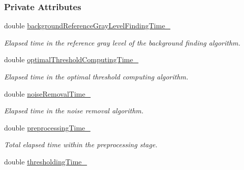 \subsubsection*{Private Attributes}
\begin{CompactItemize}
\item 
\hypertarget{class_statistics_ac1d32288eac323391e66b2ff1a878e8}{
double \hyperlink{class_statistics_ac1d32288eac323391e66b2ff1a878e8}{backgroundReferenceGrayLevelFindingTime\_\-}}
\label{class_statistics_ac1d32288eac323391e66b2ff1a878e8}

\begin{CompactList}\small\item\em Elapsed time in the reference gray level of the background finding algorithm. \item\end{CompactList}\item 
\hypertarget{class_statistics_b8cb0f26533cee29b94f3a556b00e943}{
double \hyperlink{class_statistics_b8cb0f26533cee29b94f3a556b00e943}{optimalThresholdComputingTime\_\-}}
\label{class_statistics_b8cb0f26533cee29b94f3a556b00e943}

\begin{CompactList}\small\item\em Elapsed time in the optimal threshold computing algorithm. \item\end{CompactList}\item 
\hypertarget{class_statistics_acacd5443d740dda6ddd83deb777ec4b}{
double \hyperlink{class_statistics_acacd5443d740dda6ddd83deb777ec4b}{noiseRemovalTime\_\-}}
\label{class_statistics_acacd5443d740dda6ddd83deb777ec4b}

\begin{CompactList}\small\item\em Elapsed time in the noise removal algorithm. \item\end{CompactList}\item 
\hypertarget{class_statistics_91e724d9ef7b96e1df3310c61234ebbd}{
double \hyperlink{class_statistics_91e724d9ef7b96e1df3310c61234ebbd}{preprocessingTime\_\-}}
\label{class_statistics_91e724d9ef7b96e1df3310c61234ebbd}

\begin{CompactList}\small\item\em Total elapsed time within the preprocessing stage. \item\end{CompactList}\item 
\hypertarget{class_statistics_e830ef1e50443eda784cadb18ca2b0d1}{
double \hyperlink{class_statistics_e830ef1e50443eda784cadb18ca2b0d1}{thresholdingTime\_\-}}
\label{class_statistics_e830ef1e50443eda784cadb18ca2b0d1}


\end{CompactItemize}

